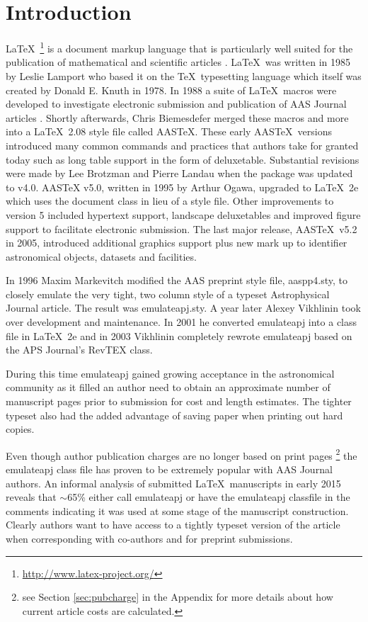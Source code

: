 \documentclass{aastex6}
\newcommand\aastex{AAS\TeX}
\newcommand\latex{La\TeX}
\begin{document}
\section{Introduction} \label{sec:intro}

\latex\ \footnote{\url{http://www.latex-project.org/}} is a document markup
language that is particularly well suited for the publication of
mathematical and scientific articles \citep{lamport94}. \latex\ was written
in 1985 by Leslie Lamport who based it on the \TeX\ typesetting language
which itself was created by Donald E. Knuth in 1978.  In 1988 a suite of
\latex\ macros were developed to investigate electronic submission and
publication of AAS Journal articles \citep{1989BAAS...21..780H}.  Shortly
afterwards, Chris Biemesdefer merged these macros and more into a \latex\
2.08 style file called \aastex.  These early \aastex\ versions introduced
many common commands and practices that authors take for granted today such
as long table support in the form of deluxetable.  Substantial revisions
were made by Lee Brotzman and Pierre Landau when the package was updated to
v4.0.  AASTeX v5.0, written in 1995 by Arthur Ogawa, upgraded to \latex\ 2e
which uses the document class in lieu of a style file.  Other improvements
to version 5 included hypertext support, landscape deluxetables and
improved figure support to facilitate electronic submission.  The last
major release, \aastex\ v5.2 in 2005, introduced additional graphics
support plus new mark up to identifier astronomical objects, datasets and
facilities.

In 1996 Maxim Markevitch modified the AAS preprint style file, aaspp4.sty,
to closely emulate the very tight, two column style of a typeset
Astrophysical Journal article.  The result was emulateapj.sty.  A year
later Alexey Vikhlinin took over development and maintenance.  In 2001 he
converted emulateapj into a class file in \latex\ 2e and in 2003 Vikhlinin
completely rewrote emulateapj based on the APS Journal's RevTEX class.

During this time emulateapj gained growing acceptance in the astronomical
community as it filled an author need to obtain an approximate number of
manuscript pages prior to submission for cost and length estimates. The
tighter typeset also had the added advantage of saving paper when printing
out hard copies.

Even though author publication charges are no longer based on print pages
\footnote{see Section \ref{sec:pubcharge} in the Appendix for more details
about how current article costs are calculated.} the emulateapj class file
has proven to be extremely popular with AAS Journal authors.  An informal
analysis of submitted \latex\ manuscripts in early 2015 reveals that
$\sim$65\% either call emulateapj or have the emulateapj classfile in the
comments indicating it was used at some stage of the manuscript
construction.  Clearly authors want to have access to a tightly typeset
version of the article when corresponding with co-authors and for preprint
submissions.
\end{document}
